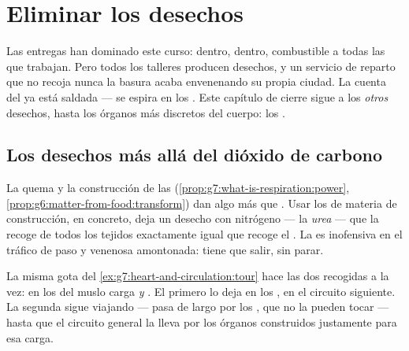 \chapter{Eliminar los desechos}\label{ch:g7:removing-wastes}

Las entregas han dominado este curso:  dentro, 
dentro, combustible a todas las  que trabajan. Pero todos los
talleres producen desechos, y un servicio de reparto que no recoja
nunca la basura acaba envenenando su propia ciudad. La cuenta del
 ya está saldada --- se espira en los . Este
capítulo de cierre sigue a los \emph{otros} desechos, hasta los órganos
más discretos del cuerpo: los .

\section{Los desechos más allá del dióxido de carbono}

\begin{proposition}\label{prop:g7:removing-wastes:rubbish}
La quema y la construcción de las 
(\cref{prop:g7:what-is-respiration:power},
\cref{prop:g6:matter-from-food:transform}) dan algo más que . Usar los  de materia de construcción, en concreto,
deja un desecho con nitrógeno --- la \emph{urea} --- que la
 recoge de todos los tejidos exactamente igual que recoge el
. La  es inofensiva en el tráfico de paso y
venenosa amontonada: tiene que salir, sin parar.
\end{proposition}
\admitted

\begin{example}\label{ex:g7:removing-wastes:rounds}
La misma gota del \cref{ex:g7:heart-and-circulation:tour} hace las dos
recogidas a la vez: en los  del muslo carga 
\emph{y} . El primero lo deja en los , en el circuito
siguiente. La segunda sigue viajando --- pasa de largo por los
, que no la pueden tocar --- hasta que el circuito general la
lleva por los órganos construidos justamente para esa carga.
\end{example}

